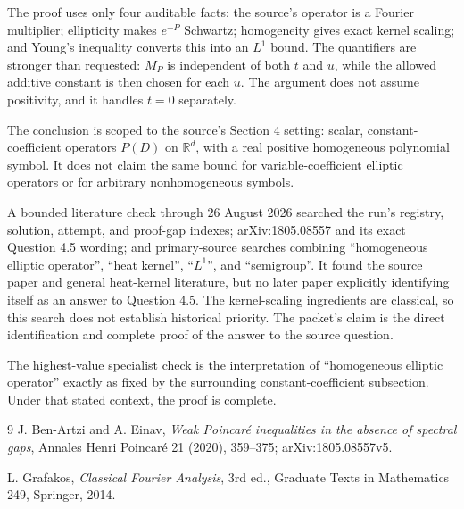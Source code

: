 \documentclass[11pt]{article}
\theoremstyle{remark}
\newcommand{\R}{\mathbb R}
\begin{document}
The proof uses only four auditable facts: the source's operator is a Fourier
multiplier; ellipticity makes \(e^{-P}\) Schwartz; homogeneity gives exact
kernel scaling; and Young's inequality converts this into an \(L^1\) bound.
The quantifiers are stronger than requested: \(M_P\) is independent of both
\(t\) and \(u\), while the allowed additive constant is then chosen for each
\(u\).  The argument does not assume positivity, and it handles \(t=0\)
separately.

The conclusion is scoped to the source's Section 4 setting: scalar,
constant-coefficient operators \(P(D)\) on \(\R^d\), with a real positive
homogeneous polynomial symbol.  It does not claim the same bound for
variable-coefficient elliptic operators or for arbitrary nonhomogeneous
symbols.

A bounded literature check through 26 August 2026 searched the run's
registry, solution, attempt, and proof-gap indexes; arXiv:1805.08557 and its
exact Question 4.5 wording; and primary-source searches combining
``homogeneous elliptic operator'', ``heat kernel'', ``\(L^1\)'', and
``semigroup''.  It found the source paper and general heat-kernel literature,
but no later paper explicitly identifying itself as an answer to Question
4.5.  The kernel-scaling ingredients are classical, so this search does not
establish historical priority.  The packet's claim is the direct
identification and complete proof of the answer to the source question.

The highest-value specialist check is the interpretation of ``homogeneous
elliptic operator'' exactly as fixed by the surrounding constant-coefficient
subsection.  Under that stated context, the proof is complete.

\begingroup
\small
\begin{thebibliography}{9}
J. Ben-Artzi and A. Einav,
\emph{Weak Poincar\'e inequalities in the absence of spectral gaps},
Annales Henri Poincar\'e 21 (2020), 359--375;
arXiv:1805.08557v5.

L. Grafakos,
\emph{Classical Fourier Analysis}, 3rd ed.,
Graduate Texts in Mathematics 249, Springer, 2014.
\end{thebibliography}
\endgroup
\end{document}
